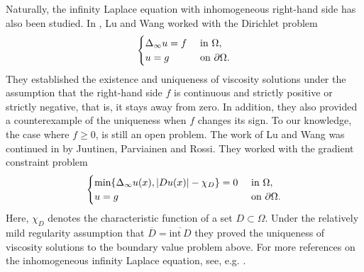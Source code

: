 \documentclass[11pt]{article}
\newcommand{\inte}{\mathrm{int}}
\newcommand{\ol}{\overline}
\numberwithin{equation}{section}
\theoremstyle{definition}
\begin{document}
Naturally, the infinity Laplace equation with inhomogeneous right-hand side has also been studied. In \cite{LW2008}, Lu and Wang worked with the Dirichlet problem
\begin{align*}  
\begin{cases}
\Delta_{\infty} u = f&  \textup{ in }  \Omega, \\
 u =g &  \textup{ on }  \partial \Omega.
\end{cases}
\end{align*}
 They established the existence and uniqueness of viscosity solutions under the assumption that the right-hand side $f$ is continuous and strictly positive or strictly negative, that is, it stays away from zero. In addition, they also provided a counterexample of the uniqueness when $f$ changes its sign. To our knowledge, the case where $f \geq 0$, is still an open problem. The work of Lu and Wang was continued in \cite{JPR2016} by Juutinen, Parviainen and Rossi. They worked with the gradient constraint problem
\begin{align*}  
\begin{cases}
 \textup{min}\{\Delta_{\infty} u(x), |Du(x)|-\chi_D \}=0&  \textup{ in }  \Omega, \\
 u =g&  \textup{ on }  \partial \Omega.
\end{cases}
\end{align*}
Here, $\chi_D$ denotes the characteristic function of a set $D \subset \Omega$.
Under the relatively mild regularity assumption that $\ol{D}=\ol{\inte \, D}$ they proved the uniqueness of viscosity solutions to the boundary value problem above. For more references on the inhomogeneous infinity Laplace equation, see, e.g. \cite{BDM1991,CP2007,IL2005,Y2010}.
\end{document}
